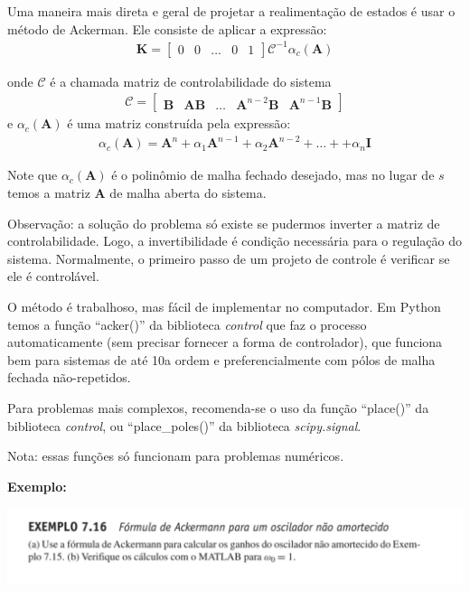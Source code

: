 \documentclass[
]{book}
\begin{document}
Uma maneira mais direta e geral de projetar a realimentação de estados é
usar o método de Ackerman. Ele consiste de aplicar a expressão:
\begin{align}
    \mathbf{K} = \left[\begin{array}{ccccc}0&0&\ldots & 0 & 1\end{array}\right]\mathbf{\mathcal{C}}^{-1}\alpha_c(\mathbf{A})
\end{align}

onde \(\mathbf{\mathcal{C}}\) é a chamada matriz de controlabilidade do
sistema
\begin{align}
    \mathbf{\mathcal{C}} = \left[\begin{array}{ccccc}\mathbf{B}&\mathbf{AB}&\ldots & \mathbf{A}^{n-2}\mathbf{B} & \mathbf{A}^{n-1}\mathbf{B}\end{array}\right]
\end{align}
e \(\alpha_c(\mathbf{A})\) é uma matriz construída pela expressão:
\begin{align}
    \alpha_c(\mathbf{A}) = \mathbf{A}^{n}+\alpha_1\mathbf{A}^{n-1}+\alpha_2\mathbf{A}^{n-2}+\ldots++\alpha_n\mathbf{I}
\end{align}

Note que \(\alpha_c(\mathbf{A})\) é o polinômio de malha fechado desejado,
mas no lugar de \(s\) temos a matriz \(\mathbf{A}\) de malha aberta do
sistema.

Observação: a solução do problema só existe se pudermos inverter a
matriz de controlabilidade. Logo, a invertibilidade é condição
necessária para o regulação do sistema. Normalmente, o primeiro passo de
um projeto de controle é verificar se ele é controlável.

O método é trabalhoso, mas fácil de implementar no computador. Em Python
temos a função ``acker()'' da biblioteca \emph{control} que faz o processo
automaticamente (sem precisar fornecer a forma de controlador), que
funciona bem para sistemas de até 10a ordem e preferencialmente com
pólos de malha fechada não-repetidos.

Para problemas mais complexos, recomenda-se o uso da função ``place()'' da
biblioteca \emph{control}, ou ``place\_poles()'' da biblioteca \emph{scipy.signal}.

Nota: essas funções só funcionam para problemas numéricos.

\textbf{Exemplo:}

\includegraphics[width=1.2\linewidth]{./figs/Ex7.16}
\end{document}
